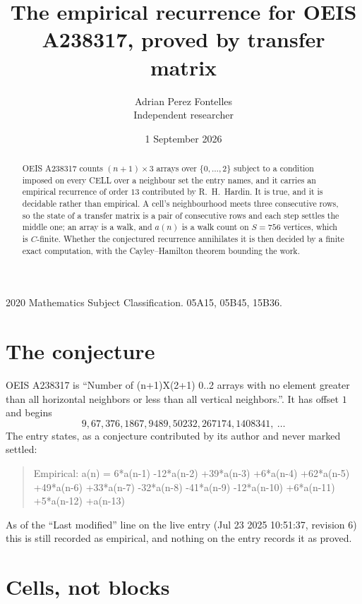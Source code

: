 \documentclass[11pt,a4paper]{article}
\title{The empirical recurrence for OEIS A238317, proved by transfer matrix}
\author{Adrian Perez Fontelles\\ \small Independent researcher}
\date{1 September 2026}
\theoremstyle{plain}
\theoremstyle{definition}
\begin{document}
\maketitle

\begin{abstract}
OEIS A238317 counts $(n+1)\times3$ arrays over $\{0,\dots,2\}$ subject to a condition imposed on
every CELL over a neighbour set the entry names, and it carries an empirical recurrence of
order $13$ contributed by R.~H.~Hardin. It is true, and it is decidable rather than
empirical. A cell's neighbourhood meets three consecutive rows, so the state of a transfer
matrix is a pair of consecutive rows and each step settles the middle one; an array is a
walk, and $a(n)$ is a walk count on $S=756$ vertices, which is $C$-finite. Whether the
conjectured recurrence annihilates it is then decided by a finite exact computation, with the
Cayley--Hamilton theorem bounding the work.
\end{abstract}

\noindent\small 2020 Mathematics Subject Classification. 05A15, 05B45, 15B36.\normalsize

\section{The conjecture}

OEIS A238317 is ``Number of (n+1)X(2+1) 0..2 arrays with no element greater than all horizontal neighbors or less than all vertical neighbors.''. It has offset $1$ and begins
\[
9, 67, 376, 1867, 9489, 50232, 267174, 1408341,\ \dots
\]
The entry states, as a conjecture contributed by its author and never marked settled:
\begin{quote}
Empirical: a(n) = 6*a(n-1) -12*a(n-2) +39*a(n-3) +6*a(n-4) +62*a(n-5) +49*a(n-6) +33*a(n-7) -32*a(n-8) -41*a(n-9) -12*a(n-10) +6*a(n-11) +5*a(n-12) +a(n-13)
\end{quote}
As of the ``Last modified'' line on the live entry (Jul 23 2025 10:51:37, revision 6) this is still
recorded as empirical, and nothing on the entry records it as proved.

\section{Cells, not blocks}
\end{document}
